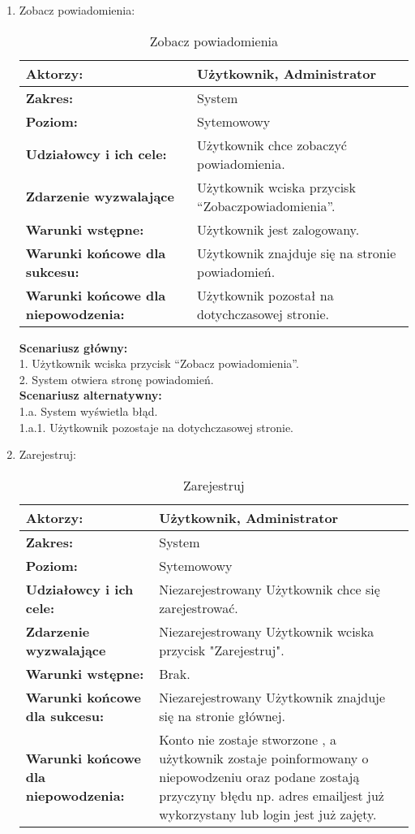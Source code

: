 \begin{enumerate}[label=(\Roman*)]
\item Zobacz powiadomienia:
	\begin{table}[H]
\centering
\caption{Zobacz powiadomienia}
\label{Zobaczpowiadomienia}
\begin{tabular}{|p{7cm}|p{7cm}|}
  \hline 
  \textbf{Aktorzy:} & Użytkownik, Administrator\\
  \hline
  \textbf{Zakres:} & System \\
	\hline
  \textbf{Poziom:} & Sytemowowy \\
	\hline
  \textbf{Udziałowcy i ich cele: } & Użytkownik chce zobaczyć powiadomienia. \\
	\hline
  \textbf{Zdarzenie wyzwalające } & Użytkownik wciska przycisk “Zobaczpowiadomienia”. \\
	\hline
  \textbf{Warunki wstępne: } & Użytkownik jest zalogowany. 
 \\
	\hline
  \textbf{Warunki końcowe dla sukcesu:} & Użytkownik znajduje się na stronie powiadomień.\\
	\hline
  \textbf{Warunki końcowe dla niepowodzenia:} & Użytkownik pozostał na dotychczasowej stronie. \\
  \hline
\end{tabular} 
\end{table}
\textbf{Scenariusz główny:}\\
1. Użytkownik wciska przycisk “Zobacz powiadomienia”.\\
2. System otwiera stronę powiadomień.\\
\textbf{Scenariusz alternatywny:}\\
1.a. System wyświetla błąd.\\
1.a.1. Użytkownik pozostaje na dotychczasowej stronie.\\

\item Zarejestruj:
	\begin{table}[H]
\centering
\caption{Zarejestruj}
\label{Zarejestruj}
\begin{tabular}{|p{7cm}|p{7cm}|}
  \hline 
  \textbf{Aktorzy:} & Użytkownik, Administrator\\
  \hline
  \textbf{Zakres:} & System \\
	\hline
  \textbf{Poziom:} & Sytemowowy \\
	\hline
  \textbf{Udziałowcy i ich cele: } & Niezarejestrowany Użytkownik chce się zarejestrować. \\
	\hline
  \textbf{Zdarzenie wyzwalające } & Niezarejestrowany Użytkownik wciska przycisk "Zarejestruj".\\
	\hline
  \textbf{Warunki wstępne: } & Brak. \\
	\hline
  \textbf{Warunki końcowe dla sukcesu:} & Niezarejestrowany Użytkownik znajduje się na stronie głównej.\\
	\hline
  \textbf{Warunki końcowe dla niepowodzenia:} & Konto nie zostaje stworzone , a użytkownik zostaje poinformowany o niepowodzeniu oraz podane zostają przyczyny błędu np. adres emailjest już wykorzystany lub login jest już zajęty. \\
  \hline
\end{tabular} 
\end{table}


\end{enumerate}
